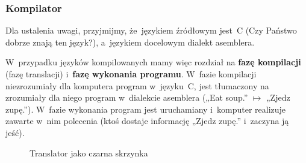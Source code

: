 \documentclass[10pt,t]{beamer}
\begin{document}
\begin{frame}
  \frametitle{Kompilator}


  Dla ustalenia uwagi, przyjmijmy, że~językiem źródłowym jest~C
  (Czy Państwo dobrze znają ten język?), a~językiem docelowym dialekt
  asemblera.

  W~przypadku języków kompilowanych mamy więc rozdział na \textbf{fazę
    kompilacji} (fazę translacji) i~\textbf{fazę wykonania programu}.
  W~fazie kompilacji niezrozumiały dla komputera program w~języku~C,
  jest tłumaczony na zrozumiały dla niego program w~dialekcie asemblera
  („Eat soup.” $\mapsto$ „Zjedz zupę.”). W~fazie wykonania program jest
  uruchamiany i~komputer realizuje zawarte w~nim polecenia (ktoś dostaje
  informację „Zjedz zupę.” i~zaczyna ją jeść).





  \begin{figure}

    \label{fig:Translator-04}


    \caption{Translator jako czarna skrzynka}


  \end{figure}

\end{frame}
\end{document}

